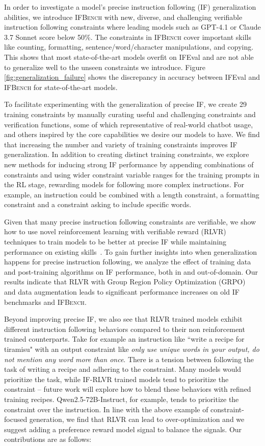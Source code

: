 \documentclass{article}
\newcommand{\benchname}{\textsc{IFBench}\xspace}
\begin{document}
In order to investigate a model's precise instruction following (IF) generalization abilities, we introduce \benchname{} with new, diverse, and challenging verifiable instruction following constraints where leading models such as GPT-4.1 or Claude 3.7 Sonnet score below 50\%. 
The constraints in \benchname{} cover important skills like counting, formatting, sentence/word/character manipulations, and copying.
This shows that most state-of-the-art models overfit on IFEval and are not able to generalize well to the unseen constraints we introduce. Figure \ref{fig:generalization_failure} shows the discrepancy in accuracy between IFEval and \benchname for state-of-the-art models.


To facilitate experimenting with the generalization of precise IF, we create 29 training constraints by manually curating useful and challenging constraints and verification functions, some of which representative of real-world chatbot usage, and others inspired by the core capabilities we desire our models to have. 
We find that increasing the number and variety of training constraints improves IF generalization. 
In addition to creating distinct training constraints, we explore new methods for inducing strong IF performance by appending combinations of constraints and using wider constraint variable ranges for the training prompts in the RL stage, rewarding models for following more complex instructions. 
For example, an instruction could be combined with a length constraint, a formatting constraint and a constraint asking to include specific words.


Given that many precise instruction following constraints are verifiable, we show how to use novel reinforcement learning with verifiable reward (RLVR) techniques to train models to be better at precise IF while maintaining performance on existing skills~\cite{lambert2024t, guo2025deepseek}.
To gain further insights into when generalization happens for precise instruction following, we analyze the effect of training data and post-training algorithms on IF performance, both in and out-of-domain. 
Our results indicate that RLVR with Group Region Policy Optimization (GRPO)~\cite{shao2024deepseekmath} and data augmentation leads to significant performance increases on old IF benchmarks and \benchname{}.


Beyond improving precise IF, we also see that RLVR trained models exhibit different instruction following behaviors compared to their non reinforcement trained counterparts. 
Take for example an instruction like ``write a recipe for tiramisu" with an output constraint like \textit{only use unique words in your output, do not mention any word more than once}. 
There is a tension between following the task of writing a recipe and adhering to the constraint. 
Many models would prioritize the task, while IF-RLVR trained models tend to prioritize the constraint -- future work will explore how to blend these behaviors with refined training recipes. 
Qwen2.5-72B-Instruct, for example, tends to prioritize the constraint over the instruction.
In line with the above example of constraint-focused generation, we find that RLVR can lead to over-optimization and we suggest adding a preference reward model signal to balance the signals. 
Our contributions are as follows:
\end{document}
